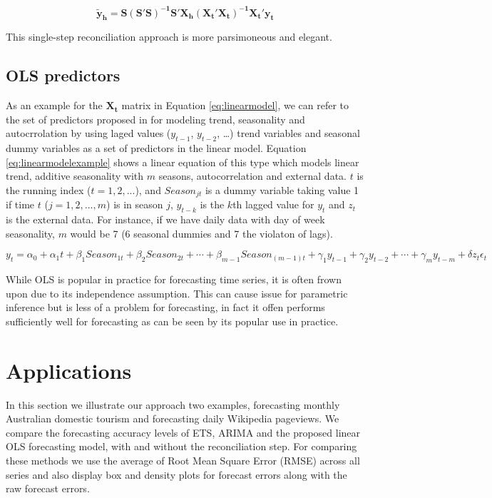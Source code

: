 \documentclass[11pt,a4paper,]{article}
\begin{document}
\begin{equation}\label{eq:reconciledforecastsonestep}
   \boldsymbol{\tilde{y}_h} = \mathbf{S(S'S)^{-1}S'}\mathbf{X_h}\mathbf{(X_t'X_t)^{-1}X_t'}\mathbf{y_t}
\end{equation}

This single-step reconciliation approach is more parsimoneous and
elegant.

\subsection{OLS predictors}\label{ols-predictors}

As an example for the \(\mathbf{X_t}\) matrix in Equation
\eqref{eq:linearmodel}, we can refer to the set of predictors proposed in
\textcite{ashouri2018} for modeling trend, seasonality and
autocrrolation by using laged values (\(y_{t-1}\), \(y_{t-2}\),
\ldots{}) trend variables and seasonal dummy variables as a set of
predictors in the linear model. Equation \eqref{eq:linearmodelexample}
shows a linear equation of this type which models linear trend, additive
seasonality with \(m\) seasons, autocorrelation and external data. \(t\)
is the running index (\(t=1,2,...\)), and \(Season_{jt}\) is a dummy
variable taking value 1 if time \(t\) (\(j=1, 2, ..., m\)) is in season
\(j\), \(y_{t-k}\) is the \(k\)th lagged value for \(y_t\) and \(z_t\)
is the external data. For instance, if we have daily data with day of
week seasonality, \(m\) would be 7 (6 seasonal dummies and 7 the
violaton of lags).

\begin{equation}\label{eq:linearmodelexample}
   y_t = \alpha_0 + \alpha_1 t + \beta_1 Season_{1t} + \beta_2 Season_{2t} + \cdots + \beta_{m-1} Season_{(m-1)t} + \gamma_1 y_{t-1} + \gamma_2 y_{t-2} + \cdots + \gamma_m y_{t-m} + \delta z_t\epsilon_t 
\end{equation}

While OLS is popular in practice for forecasting time series, it is
often frown upon due to its independence assumption. This can cause
issue for parametric inference but is less of a problem for forecasting,
in fact it offen performs sufficiently well for forecasting as can be
seen by its popular use in practice.

\section{Applications}\label{applications}

In this section we illustrate our approach two examples, forecasting
monthly Australian domestic tourism and forecasting daily Wikipedia
pageviews. We compare the forecasting accuracy levels of ETS, ARIMA and
the proposed linear OLS forecasting model, with and without the
reconciliation step. For comparing these methods we use the average of
Root Mean Square Error (RMSE) across all series and also display box and
density plots for forecast errors along with the raw forecast errors.
\end{document}
